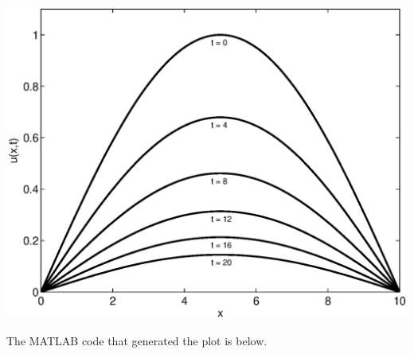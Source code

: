 \begin{solution}
\begin{enumerate}
\begin{center}
\includegraphics[scale=0.7]{checksol1}
\end{center}

The MATLAB code that generated the plot is below.



\end{enumerate}
\end{solution}

